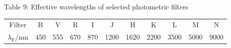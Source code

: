 \medskip
\noindent Table 9: Effective wavelengths of selected photometric filters

\begin{center}
\begin{tabular}{ccccccccccc}
\hline
Filter & B & V & R & I & J & H & K & L & M & N \\
$\lambda_{\mathrm{F}}$/nm & 450 & 555 & 670 & 870 & 1200 & 1620 & 2200 &
  3500 & 5000 & 9000 \\
\hline
\end{tabular}
\end{center}

